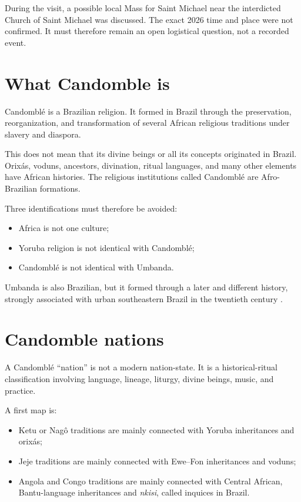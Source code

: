 During the visit, a possible local Mass
for Saint Michael near the interdicted
Church of Saint Michael was discussed.
The exact 2026 time and place were not
confirmed.  It must therefore remain an
open logistical question, not a recorded
event.

\section{What Candomble is}
\label{section-what-candomble-is}

Candombl\'e is a Brazilian religion.  It
formed in Brazil through the preservation,
reorganization, and transformation of
several African religious traditions under
slavery and diaspora.

This does not mean that its divine beings
or all its concepts originated in Brazil.
Orix\'as, voduns, ancestors, divination,
ritual languages, and many other elements
have African histories.  The religious
institutions called Candombl\'e are
Afro-Brazilian formations.

Three identifications must therefore be
avoided:

\begin{itemize}
\item Africa is not one culture;
\item Yoruba religion is not identical
with Candombl\'e;
\item Candombl\'e is not identical with
Umbanda.
\end{itemize}

Umbanda is also Brazilian, but it formed
through a later and different history,
strongly associated with urban southeastern
Brazil in the twentieth century
\cite{prandi1990umbanda}.

\section{Candomble nations}
\label{section-candomble-nations}

A Candombl\'e ``nation'' is not a modern
nation-state.  It is a historical-ritual
classification involving language,
lineage, liturgy, divine beings, music,
and practice.

A first map is:

\begin{itemize}
\item Ketu or Nag\^o traditions are mainly
connected with Yoruba inheritances and
orix\'as;
\item Jeje traditions are mainly connected
with Ewe--Fon inheritances and voduns;
\item Angola and Congo traditions are
mainly connected with Central African,
Bantu-language inheritances and
\emph{nkisi}, called inquices in Brazil.
\end{itemize}

